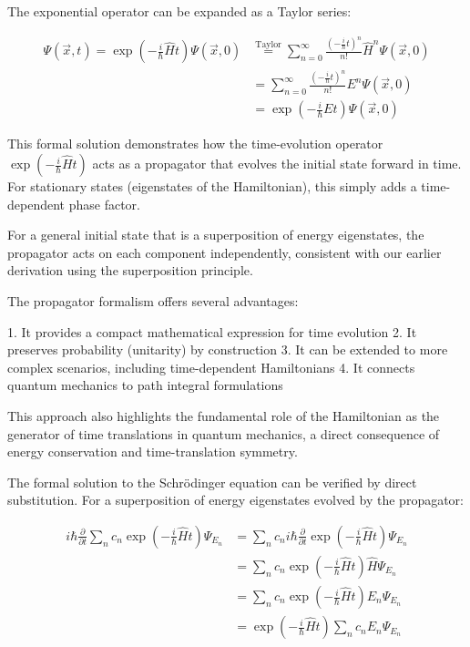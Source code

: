 \documentclass[italian]{HKNdocument}
\begin{document}
The exponential operator can be expanded as a Taylor series:

\begin{align}
\Psi(\vec{x},t) = \exp\left(-\frac{i}{\hbar}\hat{H}t\right)\Psi(\vec{x},0) &\stackrel{\text{Taylor}}{=} \sum_{n=0}^{\infty}\frac{\left(-\frac{i}{\hbar}t\right)^n}{n!}\hat{H}^n\Psi(\vec{x},0) \\
&= \sum_{n=0}^{\infty}\frac{\left(-\frac{i}{\hbar}t\right)^n}{n!}E^n\Psi(\vec{x},0) \label{eq:2.12} \\
&= \exp\left(-\frac{i}{\hbar}Et\right)\Psi(\vec{x},0)
\end{align}

This formal solution demonstrates how the time-evolution operator $\exp\left(-\frac{i}{\hbar}\hat{H}t\right)$ acts as a propagator that evolves the initial state forward in time. For stationary states (eigenstates of the Hamiltonian), this simply adds a time-dependent phase factor.

For a general initial state that is a superposition of energy eigenstates, the propagator acts on each component independently, consistent with our earlier derivation using the superposition principle.

The propagator formalism offers several advantages:

1. It provides a compact mathematical expression for time evolution
2. It preserves probability (unitarity) by construction
3. It can be extended to more complex scenarios, including time-dependent Hamiltonians
4. It connects quantum mechanics to path integral formulations

This approach also highlights the fundamental role of the Hamiltonian as the generator of time translations in quantum mechanics, a direct consequence of energy conservation and time-translation symmetry.


The formal solution to the Schrödinger equation can be verified by direct substitution. For a superposition of energy eigenstates evolved by the propagator:

\begin{align}
i\hbar\frac{\partial}{\partial t}\sum_n c_n\exp\left(-\frac{i}{\hbar}\hat{H}t\right)\Psi_{E_n} &= \sum_n c_n i\hbar\frac{\partial}{\partial t}\exp\left(-\frac{i}{\hbar}\hat{H}t\right)\Psi_{E_n} \\
&= \sum_n c_n\exp\left(-\frac{i}{\hbar}\hat{H}t\right)\hat{H}\Psi_{E_n} \\
&= \sum_n c_n\exp\left(-\frac{i}{\hbar}\hat{H}t\right)E_n\Psi_{E_n} \label{eq:2.13} \\
&= \exp\left(-\frac{i}{\hbar}\hat{H}t\right)\sum_n c_nE_n\Psi_{E_n}
\end{align}
\end{document}
